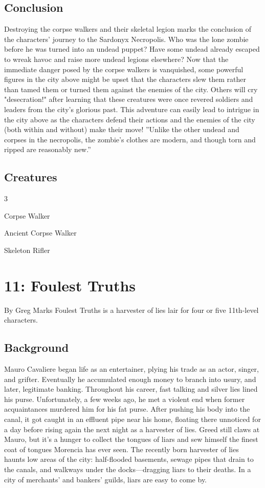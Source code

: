 \documentclass[10pt,a4paper,twoside,twocolumn,openany,bg=print,nodeprecatedcode]{dndbook}
\begin{document}
\section{Conclusion}
Destroying the corpse walkers and their skeletal legion marks the conclusion of the characters' journey to the Sardonyx Necropolis. Who was the lone zombie before he was turned into an undead puppet? Have some undead already escaped to wreak havoc and raise more undead legions elsewhere?
Now that the immediate danger posed by the corpse walkers is vanquished, some powerful figures in the city above might be upset that the characters slew them rather than tamed them or turned them against the enemies of the city. Others will cry "desecration!" after learning that these creatures were once revered soldiers and leaders from the city's glorious past. This adventure can easily lead to intrigue in the city above as the characters defend their actions and the enemies of the city (both within and without) make their move!
\DndQuote%
{}
{''Unlike the other undead and corpses in the necropolis, the zombie's clothes are modern, and though torn and ripped are reasonably new.''}
{}
\section{Creatures}

\begin{itemize}
\begin{multicols}{3}
\item Corpse Walker
\item Ancient Corpse Walker
\item Skeleton Rifler
\end{multicols}

\end{itemize}

\chapter{11: Foulest Truths}
By Greg Marks
Foulest Truths is a harvester of lies lair for four or five 11th-level characters.
\section{Background}
Mauro Cavaliere began life as an entertainer, plying his trade as an actor, singer, and grifter. Eventually he accumulated enough money to branch into usury, and later, legitimate banking. Throughout his career, fast talking and silver lies lined his purse. Unfortunately, a few weeks ago, he met a violent end when former acquaintances murdered him for his fat purse. After pushing his body into the canal, it got caught in an effluent pipe near his home, floating there unnoticed for a day before rising again the next night as a harvester of lies.
Greed still claws at Mauro, but it's a hunger to collect the tongues of liars and sew himself the finest coat of tongues Morencia has ever seen. The recently born harvester of lies haunts low areas of the city: half-flooded basements, sewage pipes that drain to the canals, and walkways under the docks—dragging liars to their deaths. In a city of merchants' and bankers' guilds, liars are easy to come by.
\end{document}
